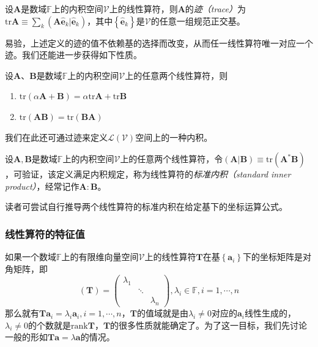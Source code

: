 \documentclass[main.tex]{subfiles}
\begin{document}
\begin{definition}[线性算符的迹]\label{def:II.2.19}
    设$\mathbf{A}$是数域$\mathbb{F}$上的内积空间$\mathcal{V}$上的线性算符，则$\mathbf{A}$的\emph{迹（trace）}为$\mathrm{tr}\mathbf{A}\equiv\sum_k\left(\mathbf{A}\mathbf{\hat{e}}_k|\mathbf{\hat{e}}_k\right)$，其中$\left\{\mathbf{\hat{e}}_k\right\}$是$\mathcal{V}$的任意一组规范正交基。
\end{definition}

易验，上述定义的迹的值不依赖基的选择而改变，从而任一线性算符唯一对应一个迹。我们还能进一步获得如下性质。

\begin{theorem}\label{thm:II.2.25}
    设$\mathbf{A}$、$\mathbf{B}$是数域$\mathbb{F}$上的内积空间$\mathcal{V}$上的任意两个线性算符，则
    \begin{enumerate}
        \item $\mathrm{tr}\left(\alpha\mathbf{A}+\mathbf{B}\right)=\alpha\mathrm{tr}\mathbf{A}+\mathrm{tr}\mathbf{B}$
        \item $\mathrm{tr}\left(\mathbf{AB}\right)=\mathrm{tr}\left(\mathbf{BA}\right)$
    \end{enumerate}
\end{theorem}

我们在此还可通过迹来定义$\mathcal{L}\left(\mathcal{V}\right)$空间上的一种内积。

\begin{definition}[线性算符的标准内积]\label{def:II.2.20}
    设$\mathbf{A},\mathbf{B}$是数域$\mathbb{F}$上的内积空间$\mathcal{V}$上的任意两个线性算符，令$\left(\mathbf{A}|\mathbf{B}\right)\equiv\mathrm{tr}\left(\mathbf{A}^*\mathbf{B}\right)$，可验证，该定义满足内积规定，称为线性算符的\emph{标准内积（standard inner product）}，经常记作$\mathbf{A}:\mathbf{B}$。
\end{definition}

读者可尝试自行推导两个线性算符的标准内积在给定基下的坐标运算公式。
\subsubsection{线性算符的特征值}
如果一个数域$\mathbb{F}$上的有限维向量空间$\mathcal{V}$上的线性算符$\mathbf{T}$在基$\left\{\mathbf{a}_i\right\}$下的坐标矩阵是对角矩阵，即
\[\left(\mathbf{T}\right)=\left(\begin{array}{ccc}\lambda_1&&\\&\ddots&\\&&\lambda_n\end{array}\right),\lambda_i\in\mathbb{F},i=1,\cdots,n\]
那么就有$\mathbf{Ta}_i=\lambda_i \mathbf{a}_i,i=1,\cdots,n$，$\mathbf{T}$的值域就是由$\lambda_i\neq 0$对应的$\mathbf{a}_i$线性生成的，$\lambda_i\neq 0$的个数就是$\mathrm{rank}\mathbf{T}$，$\mathbf{T}$的很多性质就能确定了。为了这一目标，我们先讨论一般的形如$\mathbf{Ta}=\lambda\mathbf{a}$的情况。
\end{document}
